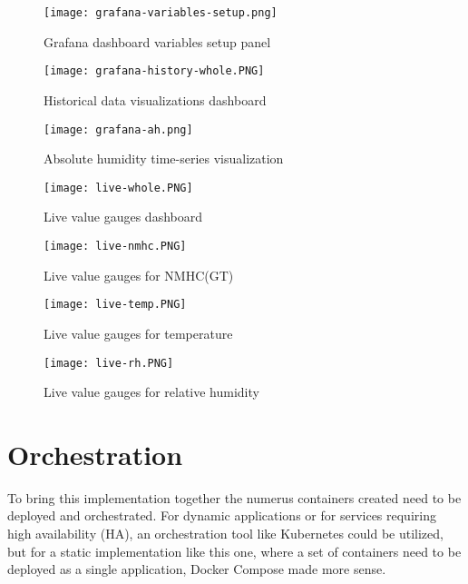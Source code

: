 \begin{figure}[!h]
    \graphicspath{ {./screenshots/} }
    \texttt{[image: grafana-variables-setup.png]}
    \centering
    \caption{Grafana dashboard variables setup panel}
    \label{fig:graf-history-whole}
\end{figure}

\begin{figure}[!h]
    \graphicspath{ {./screenshots/} }
    \texttt{[image: grafana-history-whole.PNG]}
    \centering
    \caption{Historical data visualizations dashboard}
    \label{fig:graf-history-whole}
\end{figure}

\begin{figure}[!h]
    \graphicspath{ {./screenshots/} }
    \texttt{[image: grafana-ah.png]}
    \centering
    \caption{Absolute humidity time-series visualization}
    \label{fig:graf-ah-hist}
\end{figure}

\begin{figure}[!h]
    \graphicspath{ {./screenshots/} }
    \texttt{[image: live-whole.PNG]}
    \centering
    \caption{Live value gauges dashboard}
    \label{fig:graf-live-whole}
\end{figure}

\begin{figure}[!h]
    \graphicspath{ {./screenshots/} }
    \texttt{[image: live-nmhc.PNG]}
    \centering
    \caption{Live value gauges for NMHC(GT)}
    \label{fig:graf-live-nmhc}
\end{figure}

\begin{figure}[!h]
    \graphicspath{ {./screenshots/} }
    \texttt{[image: live-temp.PNG]}
    \centering
    \caption{Live value gauges for temperature}
    \label{fig:graf-live-temp}
\end{figure}

\begin{figure}[!h]
    \graphicspath{ {./screenshots/} }
    \texttt{[image: live-rh.PNG]}
    \centering
    \caption{Live value gauges for relative humidity}
    \label{fig:graf-live-rh}
\end{figure}

\FloatBarrier
\section{Orchestration}
To bring this implementation together the numerus containers created need to be deployed and orchestrated. For dynamic applications or for services requiring high availability (HA), an orchestration tool like Kubernetes could be utilized, but for a static implementation like this one, where a set of containers need to be deployed as a single application, Docker Compose made more sense.

